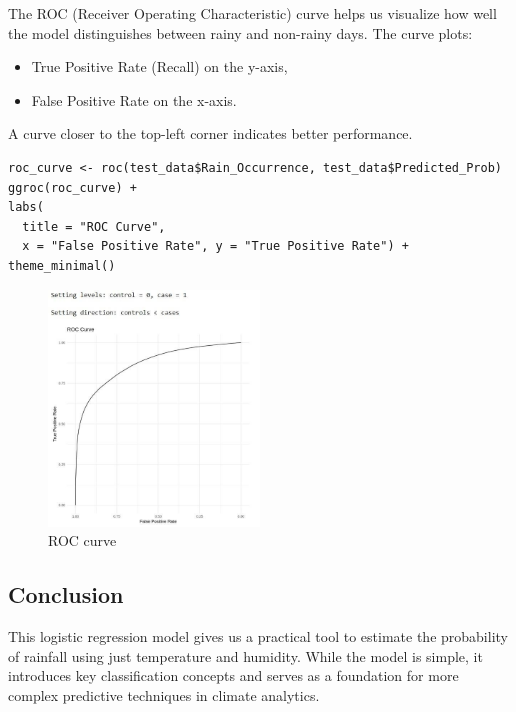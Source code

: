 The ROC (Receiver Operating Characteristic) curve helps us visualize how well the model distinguishes between rainy and non-rainy days. The curve plots:

\begin{itemize}
  \item True Positive Rate (Recall) on the y-axis,
  \item False Positive Rate on the x-axis.
\end{itemize}

A curve closer to the top-left corner indicates better performance.

\begin{verbatim}
roc_curve <- roc(test_data$Rain_Occurrence, test_data$Predicted_Prob)
ggroc(roc_curve) +
labs(
  title = "ROC Curve", 
  x = "False Positive Rate", y = "True Positive Rate") +
theme_minimal()
\end{verbatim}

\begin{figure}[h]
\centering
\includegraphics[width=0.5\textwidth]{figures/ROC.jpg}
\caption{ROC curve}
\end{figure}

\subsection*{Conclusion}

This logistic regression model gives us a practical tool to estimate the probability of rainfall using just temperature and humidity. While the model is simple, it introduces key classification concepts and serves as a foundation for more complex predictive techniques in climate analytics.
